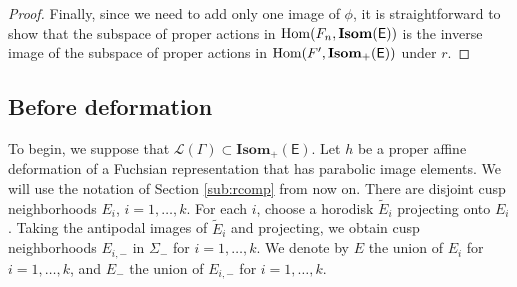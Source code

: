 \documentclass{amsart}
\numberwithin{equation}{section}
\newcommand\Hom{{\rm Hom}}
\newcommand\eps{\epsilon}
\newcommand\Isom{{\mathbf{Isom}}}
\newcommand\Ss{{\mathbb{S}}}
\newcommand\Lspace{\mathsf E}
\theoremstyle{definition}
\theoremstyle{remark}
\begin{document}
\begin{proof}
Finally,
since we need to add only one image of $\phi$, 
it is straightforward to show that 
the subspace of proper actions in $\Hom(F_n, \Isom(\Lspace))$ is 
the inverse image of the subspace of proper actions in 
$\Hom(F', \Isom_+(\Lspace))$ under $r$. 
\end{proof} 



\subsection{Before deformation} \label{sub:before} 
To begin, we suppose that $\mathcal{L}(\Gamma) \subset \Isom_+(\Lspace)$. 
%
Let $h$ be a proper affine deformation of a Fuchsian representation 
that has parabolic image elements.
We will use the notation of Section \ref{sub:rcomp} from now on. 
There are disjoint cusp neighborhoods $E_i$, $i=1, \dots, k$. 
For each $i$, choose a horodisk $\tilde E_i$ projecting onto $E_i$.
Taking the antipodal images of $\tilde E_i$ and projecting, we 
obtain 
cusp neighborhoods $E_{i, -}$ in $\Sigma_-$ for $i=1, \dots, k$. 
We denote by $E$ the union of $E_i$ for $i=1, \dots, k$, and $E_-$ the union of $E_{i,-}$ for $i=1, \dots, k$. 
\end{document}
